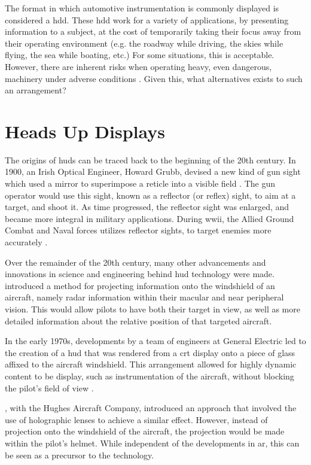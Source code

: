     \par The format in which automotive instrumentation is commonly displayed is considered a \gls{hdd}. These \gls{hdd} work for a variety of applications, by presenting information to a subject, at the cost of temporarily taking their focus away from their operating environment (e.g. the roadway while driving, the skies while flying, the sea while boating, etc.) For some situations, this is acceptable. However, there are inherent risks when operating heavy, even dangerous, machinery under adverse conditions \cite{Smith2016}. Given this, what alternatives exists to such an arrangement?

\section{Heads Up Displays}
    \par The origins of \glspl{hud} can be traced back to the beginning of the 20th century. In 1900, an Irish Optical Engineer, Howard Grubb, devised a new kind of gun sight which used a mirror to superimpose a reticle into a visible field \cite{Grubb1902}. The gun operator would use this sight, known as a reflector (or reflex) sight, to aim at a target, and shoot it. As time progressed, the reflector sight was enlarged, and became more integral in military applications. During \gls{wwii}, the Allied Ground Combat and Naval forces utilizes reflector sights, to target enemies more accurately \cite{Suits1948}.

    \par Over the remainder of the 20th century, many other advancements and innovations in science and engineering behind \gls{hud} technology were made. \cite{Nobles1958} introduced a method for projecting information onto the windshield of an aircraft, namely radar information within their macular and near peripheral vision. This would allow pilots to have both their target in view, as well as more detailed information about the relative position of that targeted aircraft.

    \par In the early 1970s, developments by a team of engineers at General Electric led to the creation of a \gls{hud} that was rendered from a \gls{crt} display onto a piece of glass affixed to the aircraft windshield. This arrangement allowed for highly dynamic content to be display, such as instrumentation of the aircraft, without blocking the pilot's field of view \cite{Antonson1973}.

    \par \cite{Withrington1976}, with the Hughes Aircraft Company, introduced an approach that involved the use of holographic lenses to achieve a similar effect. However, instead of projection onto the windshield of the aircraft, the projection would be made within the pilot's helmet. While independent of the developments in \gls{ar}, this can be seen as a precursor to the technology.


